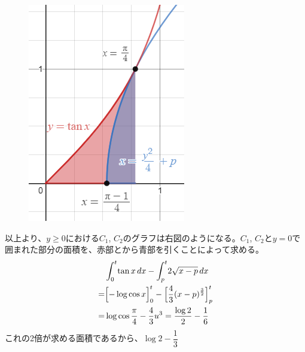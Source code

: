 \begin{figure}
 \includegraphics[width=\linewidth]{../problems/Q_149/A_149.png}
\end{figure}
以上より、$y\ge 0$における$C_1$, $C_2$のグラフは右図のようになる。$C_1$, $C_2$と$y=0$で囲まれた部分の面積を、赤部とから青部を引くことによって求める。
\begin{align*}
 & \int_0^t\! \tan x \,dx -\int_p^t\! 2\sqrt{x-p} \,dx \\
 =& \Bigl[-\log\cos x\Bigr]_0^t - \Bigl[\frac{4}{3}(x-p)^{\frac{3}{2}}\Bigr]_p^t \\
 =& \log\cos\frac{\pi}{4}-\frac{4}{3}u^3 = \frac{\log2}{2}-\frac{1}{6}
\end{align*}
これの2倍が求める面積であるから、$\log 2-\dfrac{1}{3}$